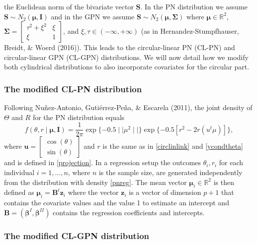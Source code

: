 \documentclass[12pt,]{article}
\begin{document}
the Euclidean norm of the bivariate vector \(\boldsymbol{S}\). In the PN
distribution we assume
\(\boldsymbol{S} \sim N_2(\boldsymbol{\mu}, \boldsymbol{I})\) and in the
GPN we assume
\(\boldsymbol{S} \sim N_2(\boldsymbol{\mu}, \boldsymbol{\Sigma})\) where
\(\boldsymbol{\mu} \in \mathbb{R}^2\),
\(\boldsymbol{\Sigma} = \begin{bmatrix} \tau^2 + \xi^2 & \xi\\ \xi & 1 \end{bmatrix}\),
and \(\xi,\tau \in (-\infty, +\infty)\) (as in Hernandez-Stumpfhauser,
Breidt, \& Woerd (2016)). This leads to the circular-linear PN (CL-PN)
and circular-linear GPN (CL-GPN) distributions. We will now detail how
we modify both cylindrical distributions to also incorporate covariates
for the circular part.

\subsubsection{The modified CL-PN distribution}

Following Nuñez-Antonio, Gutiérrez-Peña, \& Escarela (2011), the joint
density of \(\Theta\) and \(R\) for the PN distribution equals
\begin{equation}\label{pnreg}
f(\theta,r \mid \boldsymbol{\mu}, \boldsymbol{I}) = \frac{1}{2\pi} \exp\{-0.5 \mid\mid\mu^2\mid\mid\}\exp\{-0.5\left[r^2 -2r(u^t\mu) \right]\},
\end{equation} \noindent where
\(\boldsymbol{u}= \begin{bmatrix} \cos (\theta) \\ \sin (\theta) \end{bmatrix}\)
and \(r\) is the same as in \eqref{circlinlink} and \eqref{ycondtheta}
and is defined in \eqref{projection}. In a regression setup the outcomes
\(\theta_i,r_i\) for each individual \(i = 1, \dots, n\), where \(n\) is
the sample size, are generated independently from the distribution with
density \eqref{pnreg}. The mean vector
\(\boldsymbol{\mu}_i \in \mathbb{R}^2\) is then defined as
\(\boldsymbol{\mu}_i = \boldsymbol{B}^t\boldsymbol{z}_i\) where the
vector \(\boldsymbol{z}_i\) is a vector of dimension \(p + 1\) that
contains the covariate values and the value 1 to estimate an intercept
and
\(\boldsymbol{B} = (\boldsymbol{\beta}^{I}, \boldsymbol{\beta}^{II})\)
contains the regression coefficients and intercepts.

\subsubsection{The modified CL-GPN distribution}
\end{document}
